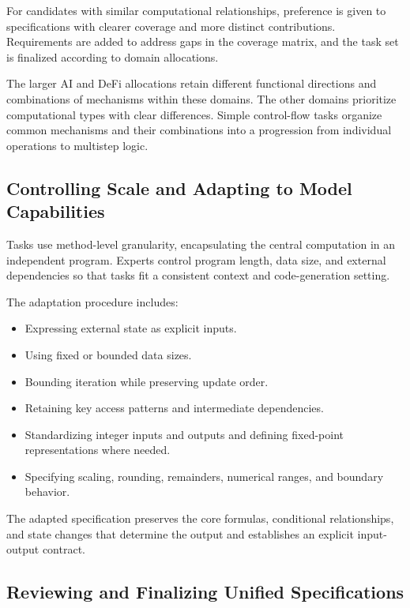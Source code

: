 \documentclass[11pt,a4paper]{article}
\begin{document}
For candidates with similar computational relationships, preference is given to specifications with clearer coverage and more distinct contributions. Requirements are added to address gaps in the coverage matrix, and the task set is finalized according to domain allocations.

The larger AI and DeFi allocations retain different functional directions and combinations of mechanisms within these domains. The other domains prioritize computational types with clear differences. Simple control-flow tasks organize common mechanisms and their combinations into a progression from individual operations to multistep logic.

\subsection{Controlling Scale and Adapting to Model Capabilities}

Tasks use method-level granularity, encapsulating the central computation in an independent program. Experts control program length, data size, and external dependencies so that tasks fit a consistent context and code-generation setting.

The adaptation procedure includes:

\begin{samepage}
\begin{itemize}
\item Expressing external state as explicit inputs.
\item Using fixed or bounded data sizes.
\item Bounding iteration while preserving update order.
\item Retaining key access patterns and intermediate dependencies.
\item Standardizing integer inputs and outputs and defining fixed-point representations where needed.
\item Specifying scaling, rounding, remainders, numerical ranges, and boundary behavior.
\end{itemize}
\end{samepage}

The adapted specification preserves the core formulas, conditional relationships, and state changes that determine the output and establishes an explicit input-output contract.

\subsection{Reviewing and Finalizing Unified Specifications}
\end{document}
